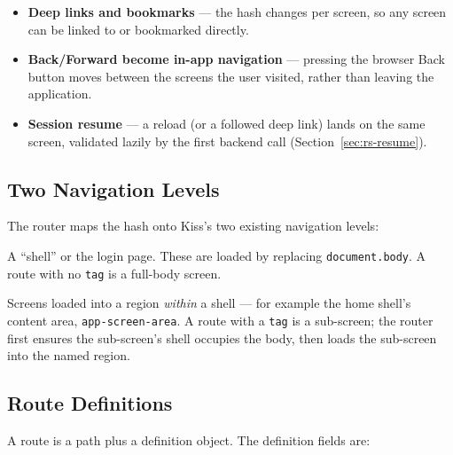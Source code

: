 \begin{itemize}
  \item \textbf{Deep links and bookmarks} --- the hash changes per screen, so any screen can be linked to or bookmarked directly.
  \item \textbf{Back/Forward become in-app navigation} --- pressing the browser Back button moves between the screens the user visited, rather than leaving the application.
  \item \textbf{Session resume} --- a reload (or a followed deep link) lands on the same screen, validated lazily by the first backend call (Section~\ref{sec:rs-resume}).
\end{itemize}

\subsection{Two Navigation Levels}
\label{sec:rs-router-levels}

The router maps the hash onto Kiss's two existing navigation levels:

\begin{description}[style=nextline]
  \item[Full-body screens] A ``shell'' or the login page.  These are loaded by replacing \texttt{document.body}.  A route with no \texttt{tag} is a full-body screen.
  \item[Sub-screens] Screens loaded into a region \emph{within} a shell --- for example the home shell's content area, \texttt{app-screen-area}.  A route with a \texttt{tag} is a sub-screen; the router first ensures the sub-screen's shell occupies the body, then loads the sub-screen into the named region.
\end{description}

\subsection{Route Definitions}
\label{sec:rs-router-defs}

A route is a path plus a definition object.  The definition fields are:

